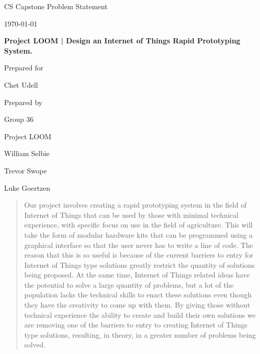\documentclass[onecolumn, draftclsnofoot,10pt, compsoc]{IEEEtran}
\def \CapstoneTeamName{		Project LOOM}
\def \CapstoneTeamNumber{		36}
\def \GroupMemberOne{			William Selbie}
\def \GroupMemberTwo{			Trevor Swope}
\def \GroupMemberThree{			Luke Goertzen}
\def \CapstoneProjectName{		Project LOOM | Design an Internet of Things Rapid Prototyping System.}
\def \CapstoneSponsorCompany{	}
\def \CapstoneSponsorPerson{		Chet Udell}
\def \DocType{		Problem Statement
				}
\newcommand{\NameSigPair}[1]{\par
\makebox[2.75in][r]{#1} \hfil 	\makebox[3.25in]{\makebox[2.25in]{\hrulefill} \hfill		\makebox[.75in]{\hrulefill}}
\par\vspace{-12pt} \textit{\tiny\noindent
\makebox[2.75in]{} \hfil		\makebox[3.25in]{\makebox[2.25in][r]{Signature} \hfill	\makebox[.75in][r]{Date}}}}
\renewcommand{\NameSigPair}[1]{#1}
\begin{document}
\begin{titlepage}
    \begin{singlespace}
        \hfill 
        \par\vspace{.2in}
        \centering
        \scshape{
            \huge CS Capstone \DocType \par
            {\large\today}\par
            \vspace{.5in}
            \textbf{\Huge\CapstoneProjectName}\par
            \vfill
            {\large Prepared for}\par
            \Huge \CapstoneSponsorCompany\par
            \vspace{5pt}
            {\Large\NameSigPair{\CapstoneSponsorPerson}\par}
            {\large Prepared by }\par
            Group\CapstoneTeamNumber\par
            \CapstoneTeamName\par 
            \vspace{5pt}
            {\Large
                \NameSigPair{\GroupMemberOne}\par
                \NameSigPair{\GroupMemberTwo}\par
                \NameSigPair{\GroupMemberThree}\par
            }
            \vspace{20pt}
        }
        \begin{abstract}
        	Our project involves creating a rapid prototyping system in the field of Internet of Things that can be used by those with minimal technical experience, with specific focus on use in the field of agriculture.
			This will take the form of modular hardware kits that can be programmed using a graphical interface so that the user never has to write a line of code. The reason that this is so useful is because of the current barriers to entry for Internet of Things type solutions greatly restrict the quantity of solutions being proposed. At the same time, Internet of Things related ideas have the potential to solve a large quantity of problems, but a lot of the population lacks the technical skills to enact these solutions even though they have the creativity to come up with them. 
			By giving those without technical experience the ability to create and build their own solutions we are removing one of the barriers to entry to creating Internet of Things type solutions, resulting, in theory, in a greater number of problems being solved. 
        \end{abstract}     
    \end{singlespace}
\end{titlepage}
\end{document}
